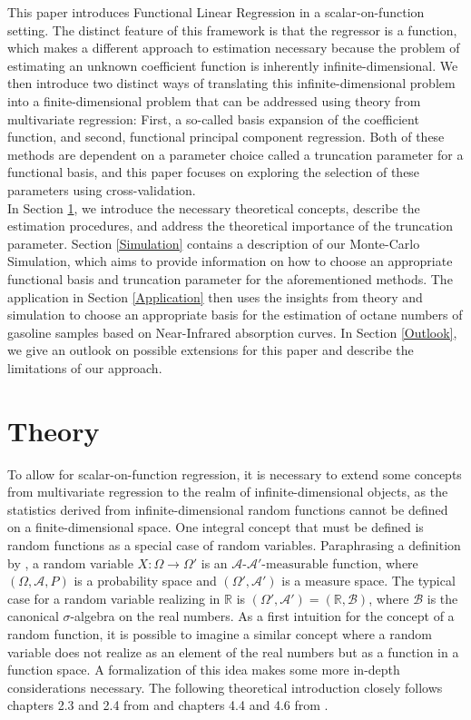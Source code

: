 \documentclass[11pt,twoside,a4paper]{article}
\begin{document}
	This paper introduces Functional Linear Regression in a scalar-on-function setting. The distinct feature of this framework is that the regressor is a function, which makes a different approach to estimation necessary because the problem of estimating an unknown coefficient function is inherently infinite-dimensional. 
	We then introduce two distinct ways of translating this infinite-dimensional problem into a finite-dimensional problem that can be addressed using theory from multivariate regression: First, a so-called basis expansion of the coefficient function, and second, functional principal component regression. Both of these methods are dependent on a parameter choice called a truncation parameter for a functional basis, and this paper focuses on exploring the selection of these parameters using cross-validation.\\
	
	In Section \ref{Theory}, we introduce the necessary theoretical concepts, describe the estimation procedures, and address the theoretical importance of the truncation parameter. Section \ref{Simulation} contains a description of our Monte-Carlo Simulation, which aims to provide information on how to choose an appropriate functional basis and truncation parameter for the aforementioned methods. The application in Section \ref{Application} then uses the insights from theory and simulation to choose an appropriate basis for the estimation of octane numbers of gasoline samples based on Near-Infrared absorption curves. In Section \ref{Outlook}, we give an outlook on possible extensions for this paper and describe the limitations of our approach.

	\section{Theory}\label{Theory}
	To allow for scalar-on-function regression, it is necessary to extend some concepts from multivariate regression to the realm of infinite-dimensional objects, as the statistics derived from infinite-dimensional random functions cannot be defined on a finite-dimensional space. One integral concept that must be defined is random functions as a special case of random variables. Paraphrasing a definition by \cite{bauer_wahrscheinlichkeitstheorie_2020}, a random variable $X:\Omega \rightarrow \Omega'$ is an $\mathcal{A} \text{-} \mathcal{A'} \text{-measurable}$ function, where $(\Omega, \mathcal{A}, P)$ is a probability space and $(\Omega', \mathcal{A'})$ is a measure space. 
	The typical case for a random variable realizing in $\mathbb{R}$ is $(\Omega', \mathcal{A'}) = (\mathbb{R}, \mathcal{B})$, where $\mathcal{B}$ is the canonical $\sigma$-algebra on the real numbers. As a first intuition for the concept of a random function, it is possible to imagine a similar concept where a random variable does not realize as an element of the real numbers but as a function in a function space. A formalization of this idea makes some more in-depth considerations necessary. The following theoretical introduction closely follows chapters 2.3 and 2.4 from \cite{hsing_theoretical_2015} and chapters 4.4 and 4.6 from \cite{kokoszka_introduction_2017}. 
	
\end{document}
